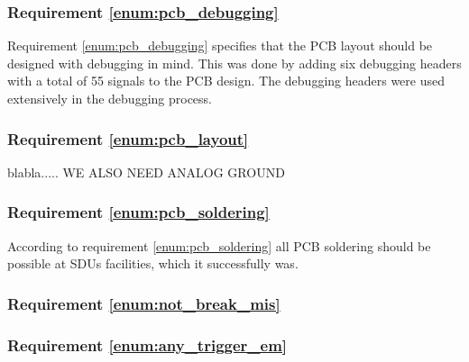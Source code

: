 \subsubsection{Requirement \ref{enum:pcb_debugging}} %
\label{ssub:requirement_enum:pcb_debugging}
Requirement \ref{enum:pcb_debugging} specifies that the PCB layout should be designed with debugging in mind.
This was done by adding six debugging headers with a total of 55 signals to the PCB design.
The debugging headers were used extensively in the debugging process.

\subsubsection{Requirement \ref{enum:pcb_layout}} %
\label{ssub:requirement_enum:pcb_layout}
blabla.....
WE ALSO NEED ANALOG GROUND

\subsubsection{Requirement \ref{enum:pcb_soldering}} %
\label{ssub:requirement_enum:pcb_soldering}
According to requirement \ref{enum:pcb_soldering} all PCB soldering should be possible at SDUs facilities, which it successfully was.


\subsubsection{Requirement \ref{enum:not_break_mis}} %
\label{ssub:requirement_enum:not_break_mis}

\subsubsection{Requirement \ref{enum:any_trigger_em}} %
\label{ssub:requirement_enum:any_trigger_em}
